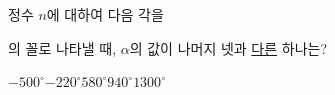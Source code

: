정수 $n$에 대하여 다음 각을 \par\smallskip{}\par\smallskip\noindent 의 꼴로 나타낼 때, $\alpha$의 값이 나머지 넷과 \underline{다른} 하나는?
\begin{choices32}{$-500^\circ$}{$-220^\circ$}{$580^\circ$}{$940^\circ$}{$1300^\circ$}\end{choices32}
